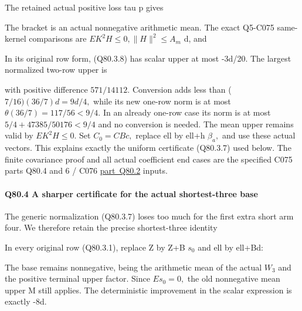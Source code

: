 
The retained actual positive loss tau p gives


The bracket is an actual nonnegative arithmetic mean. The exact
Q5-C075 same-kernel comparisons are \(EK^2H\le 0,\allowbreak  \lVert H\rVert ^2\le A_m\) d, and


In its original row form, (Q80.3.8) has scalar upper at most -3d/20.
The largest normalized two-row upper is


with positive difference \(571/14112.\) Conversion adds less than
(\(7/16)(36/7)d=9d/4,\allowbreak \) while its new one-row norm is at most
\(\theta(36/7)=117/56<9/4.\) In an already one-row case its norm is
at most \(5/4+47385/50176<9/4\) and no conversion is needed.
The mean upper remains valid by \(EK^2H\le 0.\) Set \(C_0=CBc,\allowbreak \)
replace ell by ell+h \(\beta_a,\allowbreak \) and use these actual vectors.
This explains exactly the uniform certificate (Q80.3.7) used below.
The finite covariance proof and all actual coefficient end cases
are the specified C075 parts Q80.4 and 6 / C076 \mbox{\hyperref[part:Q80.2]{part Q80.2}} inputs.

\paragraph{Q80.4 A sharper certificate for the actual shortest-three base}

The generic normalization (Q80.3.7) loses too much for the first extra
short arm four. We therefore retain the precise shortest-three identity


In every original row (Q80.3.1), replace Z by Z+B \(s_0\) and ell by ell+Bd:


The base remains nonnegative, being the arithmetic mean of the actual
\(W_3\) and the positive terminal upper factor. Since \(Es_0=0,\allowbreak \) the old
nonnegative mean upper M still applies. The deterministic improvement
in the scalar expression is exactly -8d.

